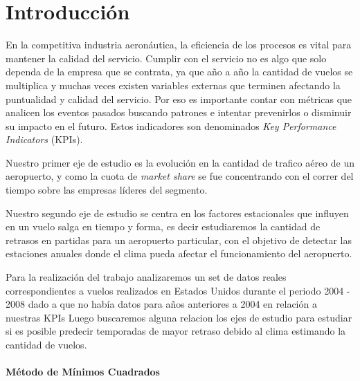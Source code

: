 \documentclass{endm}
\begin{document}
\section{Introducción}\label{intro}


En la competitiva industria aeronáutica, la eficiencia de los procesos es vital para mantener la calidad del servicio. 
Cumplir con el servicio no es algo que solo dependa de la empresa que se contrata, ya que año a año la cantidad de vuelos se multiplica y muchas veces existen variables externas que terminen afectando la puntualidad y calidad del servicio. Por eso es importante contar con métricas que analicen los eventos pasados buscando patrones e intentar prevenirlos o disminuir su impacto en el futuro. Estos indicadores son denominados \textit{Key Performance Indicators} (KPIs).

Nuestro primer eje de estudio es la evolución en la cantidad de trafico aéreo de un aeropuerto, y como la cuota de \textit{market share} se fue concentrando con el correr del tiempo sobre las empresas líderes del segmento.

Nuestro segundo eje de estudio se centra en los factores estacionales que influyen en un vuelo salga en tiempo y forma, es decir estudiaremos la cantidad de retrasos en partidas para un aeropuerto particular, con el objetivo de detectar las estaciones anuales donde el clima pueda afectar el funcionamiento del aeropuerto.

Para la realización del trabajo analizaremos un set de datos reales correspondientes a vuelos realizados en Estados Unidos durante el periodo 2004 - 2008 dado a que no había datos para años anteriores a 2004 en relación a nuestras KPIs Luego buscaremos alguna relacion los ejes de estudio para estudiar si es posible predecir temporadas de mayor retraso debido al clima estimando la cantidad de vuelos.

\paragraph{Método de Mínimos Cuadrados}
\end{document}
